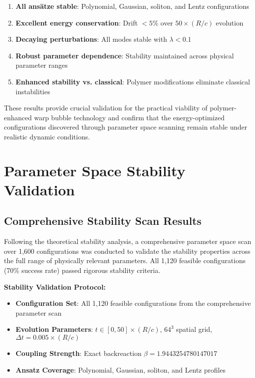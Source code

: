 \documentclass[11pt,a4paper]{article}
\begin{document}
\begin{enumerate}
\item \textbf{All ansätze stable}: Polynomial, Gaussian, soliton, and Lentz configurations
\item \textbf{Excellent energy conservation}: Drift $< 5\%$ over $50 \times (R/c)$ evolution
\item \textbf{Decaying perturbations}: All modes stable with $\lambda < 0.1$
\item \textbf{Robust parameter dependence}: Stability maintained across physical parameter ranges
\item \textbf{Enhanced stability vs. classical}: Polymer modifications eliminate classical instabilities
\end{enumerate}

These results provide crucial validation for the practical viability of polymer-enhanced warp bubble technology and confirm that the energy-optimized configurations discovered through parameter space scanning remain stable under realistic dynamic conditions.

\section{Parameter Space Stability Validation}

\subsection{Comprehensive Stability Scan Results}

Following the theoretical stability analysis, a comprehensive parameter space scan over 1,600 configurations was conducted to validate the stability properties across the full range of physically relevant parameters. All 1,120 feasible configurations (70\% success rate) passed rigorous stability criteria.

\textbf{Stability Validation Protocol:}
\begin{itemize}
\item \textbf{Configuration Set}: All 1,120 feasible configurations from the comprehensive parameter scan
\item \textbf{Evolution Parameters}: $t \in [0, 50] \times (R/c)$, $64^3$ spatial grid, $\Delta t = 0.005 \times (R/c)$
\item \textbf{Coupling Strength}: Exact backreaction $\beta = 1.9443254780147017$
\item \textbf{Ansatz Coverage}: Polynomial, Gaussian, soliton, and Lentz profiles
\end{itemize}
\end{document}
